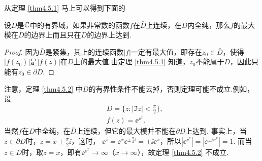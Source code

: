 从定理 \ref{thm4.5.1} 马上可以得到下面的
\begin{theorem}\label{thm4.5.2}
  设$D$是$\mathbb C$中的有界域，如果非常数的函数$f$在$\bar D$上连续，在$D$内全纯，那么$f$的最大模在$D$的边界上而且只在$D$的边界上达到.
\end{theorem}
\begin{proof}
  因为$\bar D$是紧集，其上的连续函数$|f|$一定有最大值，即存在$z_0\in\bar D$，使得$|f(z_0)|$是$|f(z)|$在$D$上的最大值.由定理 \ref{thm4.5.1} 知道，$z_0$不能属于$D$，因此只能有$z_0\in\partial D$.
\end{proof}

注意，定理 \ref{thm4.5.2} 中$D$的有界性条件不能去掉，否则定理可能不成立.例如，设
\begin{align*}
  & D = \bigg\{z:|\Im z| < \frac\pi2\bigg\},\\
  & f(z) = \ee^{\ee^z}.
\end{align*}
当然$f$在$D$中全纯，在$\bar D$上连续，但它的最大模并不能在$\partial D$上达到. 事实上，当$z\in \partial D$时，$z=x\pm\frac\pi2\ii$，这时， $\ee^z=\ee^x\ee^ {\pm\frac\pi2\ii}=\pm\ii\ee^x$，所以$|\ee^{\ee^z}|=|\ee^{\pm\ii\ee^x}|=1$. 而当$z\in D$时，取$z=x$，即有$\ee^{\ee^x}\to\infty$（$x\to\infty$），故定理 \ref{thm4.5.2} 不成立.

